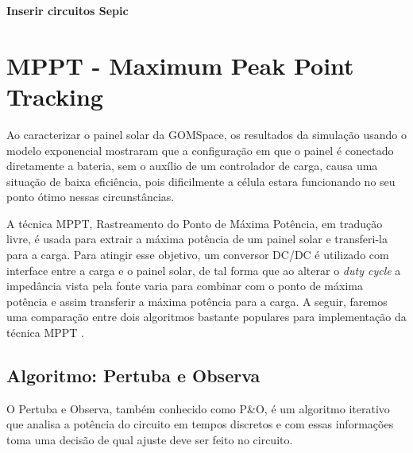 \textbf{ Inserir circuitos Sepic }


\section{MPPT - Maximum Peak Point Tracking}\label{mppt_revision}
Ao caracterizar o painel solar da GOMSpace, os resultados da simulação usando o modelo exponencial mostraram que a configuração em que o painel é conectado diretamente a bateria, sem o auxílio de um controlador de carga, causa uma situação de baixa eficiência, pois dificilmente a célula estara funcionando no seu ponto ótimo nessas circunstâncias.

A técnica MPPT, Rastreamento do Ponto de Máxima Potência, em tradução livre, é usada para extrair a máxima potência de um painel solar e transferi-la para a carga. Para atingir esse objetivo, um conversor DC/DC é utilizado com interface entre a carga e o painel solar, de tal forma que ao alterar o \textit{duty cycle} a impedância vista pela fonte varia para combinar com o ponto de máxima potência e assim transferir a máxima potência para a carga. A seguir, faremos uma comparação entre dois algoritmos bastante populares para implementação da técnica MPPT \cite{mppt_comparison}.

\subsection{Algoritmo: Pertuba e Observa}
O Pertuba e Observa, também conhecido como P\&O, é um algoritmo iterativo que analisa a potência do circuito em tempos discretos e com essas informações toma uma decisão de qual ajuste deve ser feito no circuito. 

\noindent
\begin{minipage}{\linewidth}
\label{PO_flux_fig}
\end{minipage}

